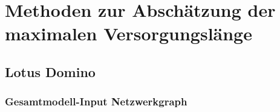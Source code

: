 \chapter{Methoden zur Abschätzung der maximalen Versorgungslänge}



\section{Lotus Domino}
\label{sec:2methoden}


\subsection{Gesamtmodell-Input Netzwerkgraph}
\label{sec:2 modelle}
%
%
%
%
%
%
%
%

